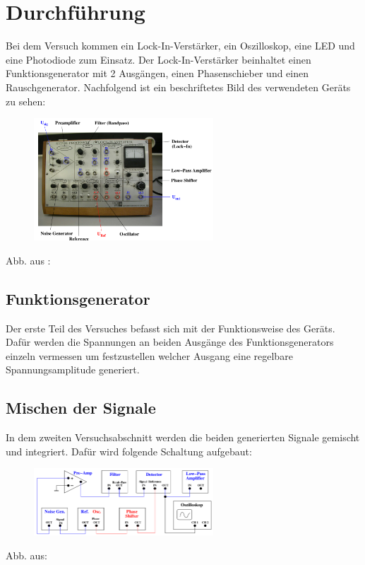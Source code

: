 \section{Durchführung}
\label{sec:Durchfuehrung}

Bei dem Versuch kommen ein Lock-In-Verstärker, ein Oszilloskop, eine
LED und eine Photodiode zum Einsatz. Der Lock-In-Verstärker beinhaltet
einen Funktionsgenerator  mit 2 Ausgängen, einen Phasenschieber und einen
Rauschgenerator. Nachfolgend ist ein beschriftetes Bild des verwendeten Geräts
zu sehen:
\begin{figure}[H]
  \centering
  \includegraphics[keepaspectratio, width=0.6\textwidth]{geraet.png}
  \label{fig:gerät}
\end{figure}
Abb. aus : \cite[3]{Anleitung}


\subsection{Funktionsgenerator}
Der erste Teil des Versuches befasst sich mit der Funktionsweise des Geräts.
Dafür werden die Spannungen an beiden Ausgänge des Funktionsgenerators einzeln
vermessen um festzustellen welcher Ausgang eine regelbare Spannungsamplitude
generiert.

\subsection{Mischen der Signale}
In dem zweiten Versuchsabschnitt werden die beiden generierten Signale gemischt
und integriert. Dafür wird folgende Schaltung aufgebaut:

\begin{figure}
  \centering
  \includegraphics[keepaspectratio, width=0.6\textwidth]{Schaltung1.png}
  \label{fig:Schaltung1}
\end{figure}
Abb. aus: \cite[1]{Anleitung}\\

